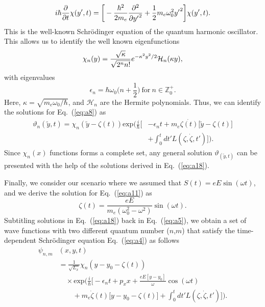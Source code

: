 \begin{equation} \label{eq:a15}
    i \hbar \pdv{t} \chi(y',t)  =
    \bigg[
        -  \frac{\hbar^2}{2m_e}\pdv[2]{{y'}}
        + \frac{1}{2} m_e \omega_0^2 {y'}^2
    \bigg] \chi(y',t).
\end{equation}
This is the well-known Schrödinger equation of the quantum harmonic oscillator.
This allows us to identify the well known eigenfunctions \cite{griffiths18,shankar94}
\begin{equation} \label{eq:a16}
  \chi_n(y) =
   \frac{\sqrt{\kappa}}{\sqrt{2^{n}n!}}
  e^{-\kappa^2 y^2/2}
  \mathcal{H}_n \qty(\kappa y),
\end{equation}
with eigenvalues
\begin{equation} \label{eq:a17}
  \epsilon_n = \hbar \omega_0 \bigg(n + \frac{1}{2}\bigg)
  ~\text{for}~
  n \in \mathbb{Z}^{+}_0.
\end{equation}
Here, $\kappa = \sqrt{{m_e \omega_0}/{\hbar}}$, and $\mathcal{H}_n$ are the Hermite polynomials.
Thus, we can identify the solutions for Eq.~(\ref{eq:a8}) as
\begin{equation} \label{eq:a18}
  \begin{aligned}
    \vartheta_n(\tilde{y},t) = \chi_n(\tilde{y} - \zeta(t))
     \text{exp}\bigg(\frac{i}{\hbar}\bigg[&- \epsilon_nt +
    m_e\dot{\zeta(t)}\big[\tilde{y}-\zeta(t)\big] \\
     & + \int_0^{t}dt'L(\zeta,\dot{\zeta},t')\bigg]\bigg).
  \end{aligned}
\end{equation}
Since $\chi_n(x)$ functions forms a complete set, any general solution $\vartheta_(\tilde{y},t)$ can be presented with the help of the solutions derived in Eq.~(\ref{eq:a18}).

Finally, we consider our scenario where we assumed that $S(t) = eE\sin(\omega t)$, and we derive the solution for Eq.~(\ref{eq:a11}) as
\begin{equation} \label{eq:a19}
  \zeta(t) = \frac{eE}{m_e(\omega_0^2 - \omega^2)}\sin(\omega t).
\end{equation}
Subtitling solutions in Eq.~(\ref{eq:a18}) back in Eq.~(\ref{eq:a5}), we obtain a set of wave functions with two different quantum number ($n$,$m$) that satisfy the time-dependent Schrödinger equation Eq.~(\ref{eq:a4}) as follows
\begin{equation} \label{eq:a20}
  \begin{aligned}
    \psi_{n,m}&(x,y,t) \\
    &=  \frac{1}{\sqrt{L_x}}
    \chi_n\left(y - y_0 - \zeta(t)\right)\\
    &\quad\times
    \text{exp}\bigg(
    \frac{i}{\hbar}\bigg[- \epsilon_nt
    + p_x x + \frac{eE[y - y_0]}{\omega}\cos(\omega t)\\
    & \quad\quad+
    m_e\dot{\zeta}(t)\big[y - y_0 -\zeta(t)\big] +
    \int_0^{t}dt'L(\zeta,\dot{\zeta},t')\bigg]\bigg).
  \end{aligned}
\end{equation}
